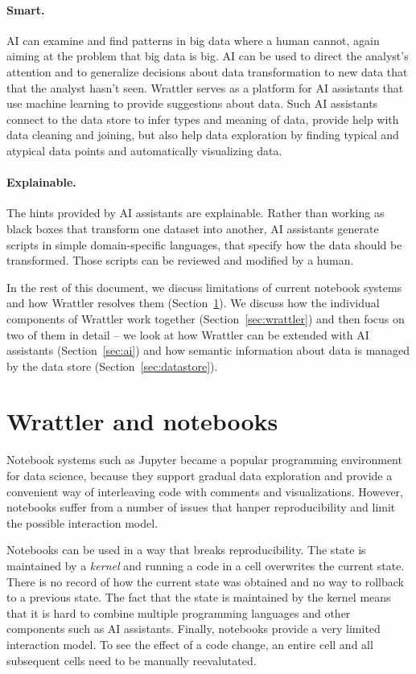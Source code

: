 \documentclass[sigplan,preprint,10pt]{acmart}\settopmatter{printfolios=true,printccs=false,printacmref=false}
\theoremstyle{plain}
\theoremstyle{definition}
\begin{document}
\paragraph{Smart.}
AI can examine and find patterns
in big data where a human cannot,
again aiming at the problem that
big data is big.
AI can be used to direct the analyst's attention and to generalize  decisions about data transformation
to new data that that the analyst
hasn't seen.
Wrattler serves as a platform for AI assistants that use machine learning to provide suggestions 
about data. Such AI assistants connect to the data store to infer types and meaning of data, provide 
help with data cleaning and joining, but also help data exploration by finding typical and atypical 
data points and automatically visualizing data.

\paragraph{Explainable.}
The hints provided by AI assistants are explainable. Rather than working as black boxes that 
transform one dataset into another, AI assistants generate scripts in simple domain-specific
languages, that specify how the data should be transformed. Those scripts can be reviewed 
and modified by a human.

\vspace{0.5em}
\noindent
In the rest of this document, we discuss limitations of current notebook systems and how Wrattler
resolves them (Section~\ref{sec:overview}). We discuss how the individual components of Wrattler
work together (Section~\ref{sec:wrattler}) and then focus on two of them in detail --
we look at how Wrattler can be extended with AI assistants (Section~\ref{sec:ai}) and
how semantic information about data is managed by the data store (Section~\ref{sec:datastore}).


\section{Wrattler and notebooks}
\label{sec:overview}

Notebook systems such as Jupyter became a popular programming environment for data science, because 
they support gradual data exploration and provide a convenient way of interleaving code with 
comments and visualizations. However, notebooks suffer from a number of issues that hanper 
reproducibility and limit the possible interaction model.

Notebooks can be used in a way that breaks reproducibility. The state is maintained by a \emph{kernel} 
and running a code in a cell overwrites the current state. There is no record of how the current 
state was obtained and no way to rollback to a previous state. The fact that the state is 
maintained by the kernel means that it is hard to combine multiple programming languages and
other components such as AI assistants. Finally, notebooks provide a very limited interaction 
model. To see the effect of a code change, an entire cell and all subsequent cells need to be
manually reevalutated.
\end{document}
